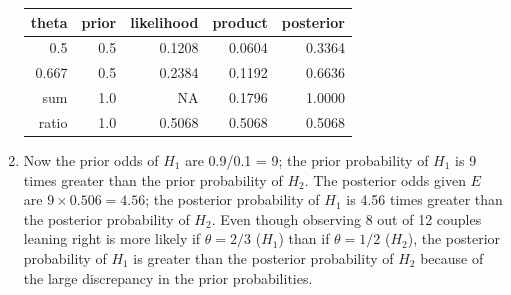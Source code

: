 \documentclass[
]{book}
\theoremstyle{definition}
\theoremstyle{definition}
\theoremstyle{definition}
\theoremstyle{remark}
\begin{document}
\begin{enumerate}
  \begin{tabular}{r|r|r|r|r}
   \hline
   theta & prior & likelihood & product & posterior\\
   \hline
   0.5 & 0.5 & 0.1208 & 0.0604 & 0.3364\\
   \hline
   0.667 & 0.5 & 0.2384 & 0.1192 & 0.6636\\
   \hline
   sum & 1.0 & NA & 0.1796 & 1.0000\\
   \hline
   ratio & 1.0 & 0.5068 & 0.5068 & 0.5068\\
   \hline
   \end{tabular}
\item
  Now the prior odds of \(H_1\) are 0.9/0.1 = 9; the prior probability of \(H_1\) is 9 times greater than the prior probability of \(H_2\). The posterior odds given \(E\) are \(9\times 0.506 = 4.56\); the posterior probability of \(H_1\) is 4.56 times greater than the posterior probability of \(H_2\). Even though observing 8 out of 12 couples leaning right is more likely if \(\theta=2/3\) (\(H_1\)) than if \(\theta = 1/2\) (\(H_2\)), the posterior probability of \(H_1\) is greater than the posterior probability of \(H_2\) because of the large discrepancy in the prior probabilities.


\end{enumerate}
\end{document}
